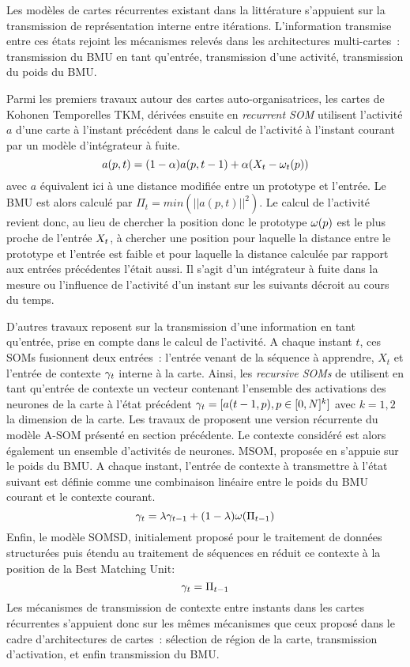 \documentclass[../main]{subfiles}
\begin{document}
Les modèles de cartes récurrentes existant dans la littérature s'appuient sur la transmission de représentation interne entre itérations. 
L'information transmise entre ces états rejoint les mécanismes relevés dans les architectures multi-cartes~: transmission du BMU en tant qu'entrée, transmission d'une activité, transmission du poids du BMU.

Parmi les premiers travaux autour des cartes auto-organisatrices, les cartes de Kohonen Temporelles TKM, dérivées ensuite en \emph{recurrent SOM} \cite{varsta_temporal_2001} utilisent l'activité $a$ d'une carte à l'instant précédent dans le calcul de l'activité à l'instant courant par un modèle d'intégrateur à fuite.
$$a(p,t) = (1-\alpha)a(p,t-1) + \alpha(X_t - \omega_t(p))$$
avec $a$ équivalent ici à une distance modifiée entre un prototype et l'entrée.
Le BMU est alors calculé par $\Pi_t = min(|| a(p,t) ||^2)$.
Le calcul de l'activité revient donc, au lieu de chercher la position donc le prototype $\omega(p)$ est le plus proche de l'entrée $X_t$, à chercher une position pour laquelle la distance entre le prototype et l'entrée est faible et pour laquelle la distance calculée par rapport aux entrées précédentes l'était aussi. Il s'agit d'un intégrateur à fuite dans la mesure ou l'influence de l'activité d'un instant sur les suivants décroit au cours du temps.

D'autres travaux reposent sur la transmission d'une information en tant qu'entrée, prise en compte dans le calcul de l'activité.
A chaque instant $t$, ces SOMs fusionnent deux entrées~: l'entrée venant de la séquence à apprendre, $X_t$ et l'entrée de contexte $\gamma_t$ interne à la carte.
Ainsi, les \emph{recursive SOMs} de \cite{Voegtlin2002RecursiveSM} utilisent en tant qu'entrée de contexte un vecteur contenant l'ensemble des activations des neurones de la carte à l'état précédent $\gamma_t = [a(t-1,p), p \in [0,N]^k]$ avec $k = 1, 2$ la dimension de la carte.
Les travaux de \cite{Buonamente2013SimulatingAW} proposent une version récurrente du modèle A-SOM présenté en section précédente. 
Le contexte considéré est alors également un ensemble d'activités de neurones. 
MSOM, proposée en \cite{Strickert2005MergeSF} s'appuie sur le poids du BMU. 
A chaque instant, l'entrée de contexte à transmettre à l'état suivant est définie comme une combinaison linéaire entre le poids du BMU courant et le contexte courant.
$$\gamma_t = \lambda \gamma_{t-1} + (1-\lambda)\omega(\Pi_{t-1}) $$
Enfin, le modèle SOMSD, initialement proposé pour le traitement de données structurées \cite{hagenbuchner_self-organizing_2003} puis étendu au traitement de séquences en \cite{hammer_recursive_2004,hammer_self-organizing_2005} réduit ce contexte à la position de la Best Matching Unit:
$$ \gamma_{t} = \Pi_{t-1}$$
Les mécanismes de transmission de contexte entre instants dans les cartes récurrentes s'appuient donc sur les mêmes mécanismes que ceux proposé dans le cadre d'architectures de cartes~: sélection de région de la carte, transmission d'activation, et enfin transmission du BMU.
\end{document}
